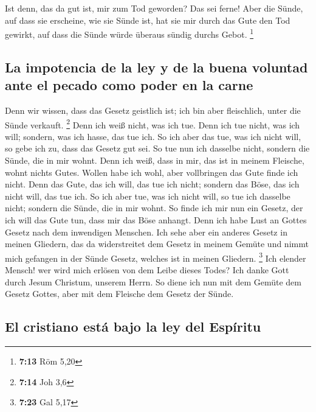  Ist denn, das da gut ist, mir zum Tod geworden? Das sei
ferne! Aber die Sünde, auf dass sie erscheine, wie sie Sünde ist, hat
sie mir durch das Gute den Tod gewirkt, auf dass die Sünde würde überaus
sündig durchs Gebot. \footnote{\textbf{7:13} Röm 5,20}

\hypertarget{la-impotencia-de-la-ley-y-de-la-buena-voluntad-ante-el-pecado-como-poder-en-la-carne}{%
\subsection{La impotencia de la ley y de la buena voluntad ante el
pecado como poder en la
carne}\label{la-impotencia-de-la-ley-y-de-la-buena-voluntad-ante-el-pecado-como-poder-en-la-carne}}

 Denn wir wissen, dass das Gesetz geistlich ist; ich bin
aber fleischlich, unter die Sünde verkauft. \footnote{\textbf{7:14} Joh
  3,6}  Denn ich weiß nicht, was ich tue. Denn ich tue
nicht, was ich will; sondern, was ich hasse, das tue ich.
 So ich aber das tue, was ich nicht will, so gebe ich zu,
dass das Gesetz gut sei.  So tue nun ich dasselbe nicht,
sondern die Sünde, die in mir wohnt.  Denn ich weiß, dass
in mir, das ist in meinem Fleische, wohnt nichts Gutes. Wollen habe ich
wohl, aber vollbringen das Gute finde ich nicht.  Denn
das Gute, das ich will, das tue ich nicht; sondern das Böse, das ich
nicht will, das tue ich.  So ich aber tue, was ich nicht
will, so tue ich dasselbe nicht; sondern die Sünde, die in mir wohnt.
 So finde ich mir nun ein Gesetz, der ich will das Gute
tun, dass mir das Böse anhangt.  Denn ich habe Lust an
Gottes Gesetz nach dem inwendigen Menschen.  Ich sehe
aber ein anderes Gesetz in meinen Gliedern, das da widerstreitet dem
Gesetz in meinem Gemüte und nimmt mich gefangen in der Sünde Gesetz,
welches ist in meinen Gliedern. \footnote{\textbf{7:23} Gal 5,17}
 Ich elender Mensch! wer wird mich erlösen von dem Leibe
dieses Todes?  Ich danke Gott durch Jesum Christum,
unserem Herrn. So diene ich nun mit dem Gemüte dem Gesetz Gottes, aber
mit dem Fleische dem Gesetz der Sünde.

\hypertarget{el-cristiano-estuxe1-bajo-la-ley-del-espuxedritu}{%
\subsection{El cristiano está bajo la ley del
Espíritu}\label{el-cristiano-estuxe1-bajo-la-ley-del-espuxedritu}}

